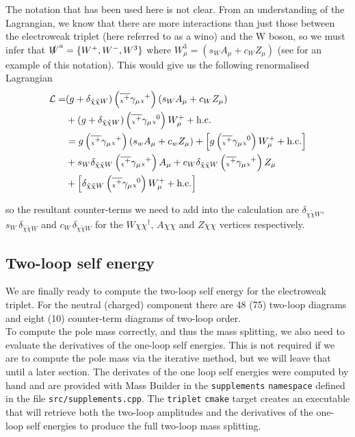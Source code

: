 \documentclass[11pt]{article}
\newcommand{\mychi}{\raisebox{0pt}[1ex][1ex]{\tiny$\chi$}}
\newcommand{\mb}{\textsf{Mass Builder} }
\begin{document}
The notation that has been used here is not clear.  From an understanding of the Lagrangian, we know that there are more interactions than just those between the electroweak triplet (here referred to as a wino) and the W boson, so we must infer that $ \slashed{W}^a = \{W^+,W^-,W^3\}$ where $W_{\mu}^3 = (s_W A_{\mu}+c_W Z_{\mu})$ (see \cite{Ostdiek2015} for an example of this notation).  This would give us the following renormalised Lagrangian
\begin{align}
\begin{split}
\mathcal{L}=
&(g+\delta_{\tilde{\chi} \tilde{\chi} W})\left(\overline{\mychi^+}\gamma_{\mu}\mychi^+\right)\left(s_WA_{\mu}+c_WZ_{\mu}\right)\\
&+(g+\delta_{\tilde{\chi} \tilde{\chi} W})\left(\overline{\mychi^+}\gamma_{\mu}\mychi^0 \right)W_{\mu}^++\text{h.c.}\\
&=g\left(\overline{\mychi^+}\gamma_{\mu}\mychi^+\right)\left(s_wA_{\mu}+c_wZ_{\mu}\right)+\left[g\left(\overline{\mychi^+}\gamma_{\mu}\mychi^0 \right)W_{\mu}^++\text{h.c.}\right]\\
&+s_W\delta_{\tilde{\chi} \tilde{\chi} W}\left(\overline{\mychi^+}\gamma_{\mu}\mychi^+\right)A_{\mu}+c_W\delta_{\tilde{\chi} \tilde{\chi} W}\left(\overline{\mychi^+}\gamma_{\mu}\mychi^+\right)Z_{\mu}\\
&+\left[\delta_{\tilde{\chi} \tilde{\chi} W}\left(\overline{\mychi^+}\gamma_{\mu}\mychi^0 \right)W_{\mu}^++\text{h.c.}\right]\\
\end{split}
\end{align}

so the resultant counter-terms we need to add into the calculation are $\delta_{\tilde{\chi} \tilde{\chi} W}$, $s_W\,\delta_{\tilde{\chi} \tilde{\chi} W}$ and $c_W\,\delta_{\tilde{\chi} \tilde{\chi} W}$ for the $W\chi\chi^{\dagger}$, $A\chi\chi$ and $Z\chi\chi$ vertices respectively.
\newpage
\subsection{Two-loop self energy}

We are finally ready to compute the two-loop self energy for the electroweak triplet.  For the neutral (charged) component there are 48 (75) two-loop diagrams and eight (10) counter-term diagrams of two-loop order.\\

To compute the pole mass correctly, and thus the mass splitting, we also need to evaluate the derivatives of the one-loop self energies.  This is not required if we are to compute the pole mass via the iterative method, but we will leave that until a later section.  The derivates of the one loop self energies were computed by hand and are provided with \mb in the \lstinline{supplements} \lstinline{namespace} defined in the file \lstinline{src/supplements.cpp}.  The \lstinline{triplet} \lstinline{cmake} target creates an executable that will retrieve both the two-loop amplitudes and the derivatives of the one-loop self energies to produce the full two-loop mass splitting.\\
\end{document}
